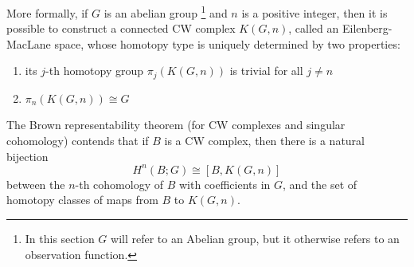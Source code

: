 \documentclass[11pt]{article}
\theoremstyle{definition}
\theoremstyle{remark}
\newcommand{\ZZ}{\mathbb{Z}}
\begin{document}
    More formally, if $G$ is  an abelian group \footnote{In this section $G$ will refer to an Abelian group, but it otherwise refers to an observation function.} and $n$  is a positive integer, then it is possible to construct a connected CW complex $K(G,n)$, called an Eilenberg-MacLane space,  whose homotopy type is uniquely determined by two properties:

    \begin{enumerate}
    \item
     its $j$-th homotopy group $\pi_j(K(G,n))$ is trivial for all $j\neq n$
    \item $\pi_n(K(G,n))\cong G$
    \end{enumerate}

    The Brown representability theorem (for CW complexes and singular cohomology) contends that if $B$ is a CW complex, then there is a natural bijection
    \begin{equation}\label{eq:BrownRep}
    H^n(B;G) \cong [B, K(G,n)]
    \end{equation}
    between the $n$-th cohomology of $B$ with coefficients in $G$,
    and the set of homotopy classes of maps from $B$ to $K(G,n)$.
\end{document}
